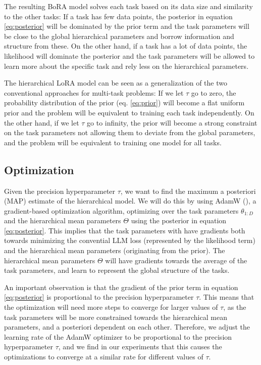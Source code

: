\documentclass[fullpaper]{nldl}
\begin{document}
The resulting BoRA model solves each task based on its data size and similarity to the other tasks: If a task has few data points, the posterior in equation \ref{eq:posterior} will be dominated by the prior term and the task parameters will be close to the global hierarchical parameters and borrow information and structure from these. On the other hand, if a task has a lot of data points, the likelihood will dominate the posterior and the task parameters will be allowed to learn more about the specific task and rely less on the hierarchical parameters.

The hierarchical LoRA model can be seen as a generalization of the two conventional approaches for multi-task problems:
If we let $\tau$ go to zero, the probability distribution of the prior (eq. \ref{eq:prior}) will become a flat uniform prior and the problem will be equivalent to training each task independently. On the other hand, if we let $\tau$ go to infinity, the prior will become a strong constraint on the task parameters not allowing them to deviate from the global parameters, and the problem will be equivalent to training one model for all tasks.

\subsection{Optimization}
Given the precision hyperparameter $\tau$, we want to find the maximum a posteriori (MAP) estimate of the hierarchical model. 
We will do this by using AdamW (\cite{adamW}), a gradient-based optimization algorithm, optimizing over the task parameters $\theta_{1:D}$ and the hierarchical mean parameters $\Theta$ using the posterior in equation \ref{eq:posterior}.
This implies that the task parameters with have gradients both towards minimizing the convential LLM loss (represented by the likelihood term) and the hierarchical mean parameters (originating from the prior). The hierarchical mean parameters $\Theta$ will have gradients towards the average of the task parameters, and learn to represent the global structure of the tasks.

An important observation is that the gradient of the prior term in equation \ref{eq:posterior} is proportional to the precision hyperparameter $\tau$. This means that the optimization will need more steps to converge for larger values of $\tau$, as the task parameters will be more constrained towards the hierarchical mean parameters, and a posteriori dependent on each other.
Therefore, we adjust the learning rate of the AdamW optimizer to be proportional to the precision hyperparameter $\tau$, and we find in our experiments that this causes the optimizations to converge at a similar rate for different values of $\tau$.
\end{document}
